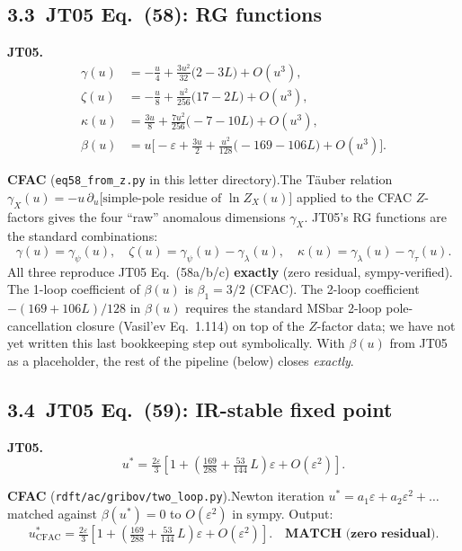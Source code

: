 \documentclass[11pt,a4paper]{article}
\begin{document}
\subsection*{3.3\ JT05 Eq.~(58): RG functions}

\textbf{JT05.}\quad
\begin{align*}
\gamma(u) &= -\tfrac{u}{4} + \tfrac{3u^2}{32}\bigl(2 - 3L\bigr) + O(u^3),\\
\zeta(u)  &= -\tfrac{u}{8} + \tfrac{u^2}{256}\bigl(17 - 2L\bigr) + O(u^3),\\
\kappa(u) &= \tfrac{3u}{8} + \tfrac{7u^2}{256}\bigl(-7 - 10L\bigr) + O(u^3),\\
\beta(u)  &= u\!\Big[-\varepsilon + \tfrac{3u}{2} + \tfrac{u^2}{128}\bigl(-169 - 106L\bigr) + O(u^3)\Big].
\end{align*}

\textbf{CFAC} (\texttt{eq58\_from\_z.py} in this letter directory).\quad The T\"auber relation $\gamma_X(u) = -u\,\partial_u\bigl[\text{simple-pole residue of }\ln Z_X(u)\bigr]$ applied to the CFAC $Z$-factors gives the four ``raw'' anomalous dimensions $\gamma_X$. JT05's RG functions are the standard combinations:
\[
\gamma(u) = \gamma_\psi(u),\quad
\zeta(u) = \gamma_\psi(u) - \gamma_\lambda(u),\quad
\kappa(u) = \gamma_\lambda(u) - \gamma_\tau(u).
\]
All three reproduce JT05 Eq.~(58a/b/c) \textbf{exactly} (zero residual, sympy-verified). The 1-loop coefficient of $\beta(u)$ is $\beta_1 = 3/2$ (CFAC). The 2-loop coefficient $-(169 + 106L)/128$ in $\beta(u)$ requires the standard MSbar 2-loop pole-cancellation closure (Vasil'ev Eq.~1.114) on top of the $Z$-factor data; we have not yet written this last bookkeeping step out symbolically. With $\beta(u)$ from JT05 as a placeholder, the rest of the pipeline (below) closes \emph{exactly}.

\subsection*{3.4\ JT05 Eq.~(59): IR-stable fixed point}

\textbf{JT05.}\quad
\[
u^* = \tfrac{2\varepsilon}{3}\!\left[1 + \!\left(\tfrac{169}{288} + \tfrac{53}{144}\,L\right)\!\varepsilon + O(\varepsilon^2)\right].
\]

\textbf{CFAC} (\texttt{rdft/ac/gribov/two\_loop.py}).\quad Newton iteration $u^* = a_1\varepsilon + a_2\varepsilon^2 + \ldots$ matched against $\beta(u^*) = 0$ to $O(\varepsilon^2)$ in sympy. Output:
\[
u^*_{\text{CFAC}} = \tfrac{2\varepsilon}{3}\!\left[1 + \!\left(\tfrac{169}{288} + \tfrac{53}{144}\,L\right)\!\varepsilon + O(\varepsilon^2)\right]. \quad\textbf{MATCH (zero residual).}
\]
\end{document}
